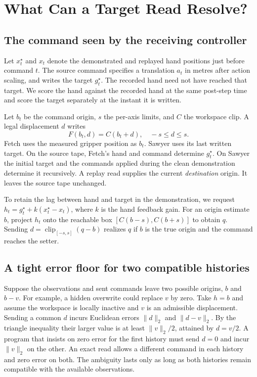 \section{What Can a Target Read Resolve?}
\subsection{The command seen by the receiving controller}
Let $x_t^\star$ and $x_t$ denote the demonstrated and replayed hand positions just before command $t$. The source command specifies a translation $a_t$ in metres after action scaling, and writes the target $g_t^\star$. The recorded hand need not have reached that target. We score the hand against the recorded hand at the same post-step time and score the target separately at the instant it is written.

Let $b_t$ be the command origin, $s$ the per-axis limits, and $C$ the workspace clip. A legal displacement $d$ writes
\begin{equation}
 F(b_t,d)=C(b_t+d),\quad -s\le d\le s .\label{eq:setter}
\end{equation}
Fetch uses the measured gripper position as $b_t$. Sawyer uses its last written target. On the source tape, Fetch's hand and command determine $g_t^\star$. On Sawyer the initial target and the commands applied during the clean demonstration determine it recursively. A replay read supplies the current \emph{destination} origin. It leaves the source tape unchanged.

To retain the lag between hand and target in the demonstration, we request $h_t=g_t^\star+k(x_t^\star-x_t)$, where $k$ is the hand feedback gain. For an origin estimate $b$, project $h_t$ onto the reachable box $[C(b-s),C(b+s)]$ to obtain $q$. Sending $d=\operatorname{clip}_{[-s,s]}(q-b)$ realizes $q$ if $b$ is the true origin and the command reaches the setter.

\subsection{A tight error floor for two compatible histories}
Suppose the observations and sent commands leave two possible origins, $b$ and $b-v$. For example, a hidden overwrite could replace $v$ by zero. Take $h=b$ and assume the workspace is locally inactive and $v$ is an admissible displacement. Sending a common $d$ incurs Euclidean errors $\|d\|_2$ and $\|d-v\|_2$. By the triangle inequality their larger value is at least $\|v\|_2/2$, attained by $d=v/2$. A program that insists on zero error for the first history must send $d=0$ and incur $\|v\|_2$ on the other. An exact read allows a different command in each history and zero error on both. The ambiguity lasts only as long as both histories remain compatible with the available observations.

